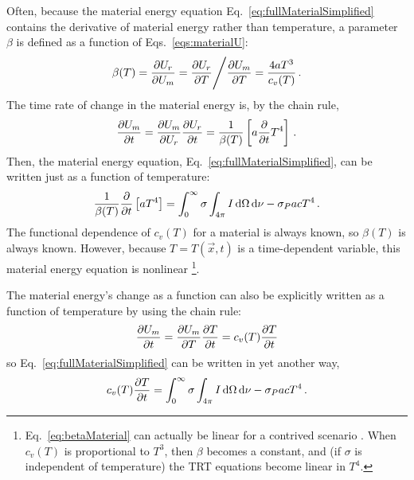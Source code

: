 \documentclass[11pt]{SRJresearch}
\begin{document}
Often, because the material energy equation
Eq.~\eqref{eq:fullMaterialSimplified} contains the derivative of material
energy rather than temperature, a parameter $\beta$ is defined as a function
of Eqs.~\eqref{eqs:materialU}:
\begin{equation} \label{eq:beta}
  \beta(T) = \frac{\partial U_r}{\partial U_m} 
  = \frac{\partial U_r}{\partial T} \Bigg/ \frac{\partial U_m}{\partial T}
  = \frac{4 a T^3}{c_v(T)} \,.
\end{equation}
The time rate of change in the material energy is, by the chain rule,
\begin{equation*}
  \frac{\partial U_m}{\partial t} = \frac{\partial U_m}{\partial U_r} \frac{\partial U_r}{\partial t}
  = \frac{1}{ \beta(T)}\left[ a \frac{\partial }{\partial t} T^4 \right] \,.
\end{equation*}
Then, the material energy equation, Eq.~\eqref{eq:fullMaterialSimplified}, can
be written just as a function of temperature:
\begin{equation} \label{eq:betaMaterial}
  \frac{1}{\beta(T)}  \frac{\partial }{\partial t}\left[ a T^4 \right]
  = \int_{0}^{\infty} \sigma  \int_{4\pi} I \mathop{}\!\mathrm{d} \Omega\mathop{}\!\mathrm{d} \nu -
  \sigma_P ac T^4 \,.
\end{equation}
The functional dependence of $c_v(T)$ for a material is always known, so
$\beta(T)$ is always known. However, because $T = T(\vec{x},t)$ is a
time-dependent variable, this material energy equation is
nonlinear%
\footnote{Eq.~\eqref{eq:betaMaterial} can actually be linear for a
contrived scenario \cite{Pom1979,Su1997}. When $c_v(T)$ is proportional to
$T^3$, then $\beta$ becomes a constant, and (if $\sigma$ is independent of
temperature) the TRT equations become linear in $T^4$.
}.

The material energy's change as a function can also be explicitly written as a
function of temperature by using the chain rule:
\begin{equation*}
  \frac{\partial U_m}{\partial t} = \frac{\partial U_m}{\partial T} \frac{\partial T}{\partial t}
  = c_v(T) \frac{\partial T}{\partial t}
\end{equation*}
so Eq.~\eqref{eq:fullMaterialSimplified} can be written in yet another way, 
\begin{equation} \label{eq:cvdTdtMaterial}
  c_v(T) \frac{\partial T}{\partial t}
  = \int_{0}^{\infty} \sigma  \int_{4\pi} I \mathop{}\!\mathrm{d} \Omega\mathop{}\!\mathrm{d} \nu -
  \sigma_P ac T^4 \,.
\end{equation}

\end{document}

